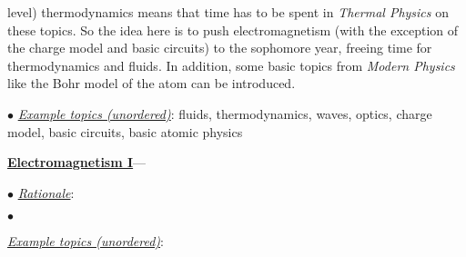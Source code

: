\documentclass[12pt,preprint]{aastex}
\begin{document}
\begin{itemize*}
{\begin{itemize*}
{      level) thermodynamics means that time has to be spent in {\em Thermal
        Physics} on these topics.  So the idea here is to push electromagnetism
      (with the exception of the charge model and basic circuits) to the
      sophomore year, freeing time for thermodynamics and fluids.  In addition,
      some basic topics from {\em Modern Physics} like the Bohr model of the
      atom can be introduced.}
    \item[$\bullet$]{\underline{\em Example topics (unordered)}: fluids,
      thermodynamics, waves, optics, charge model, basic circuits, basic atomic
      physics}
  \end{itemize*}
}
\item{\underline{{\bf Electromagnetism I}}---


  \begin{itemize*}
    \item[$\bullet$]{\underline{\em Rationale}: }
    \item[$\bullet$]{\underline{\em Example topics (unordered)}: 

}
  \end{itemize*}
}
\end{itemize*}




\end{document}
